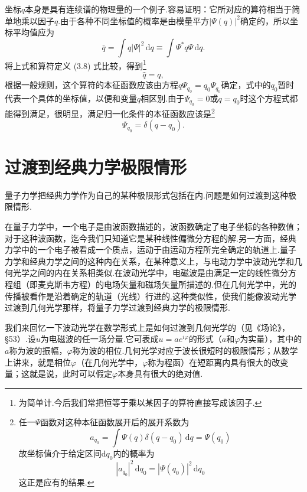坐标$q$本身是具有连续谱的物理量的一个例子.容易证明：它所对应的算符相当于简单地乘以因子$q$.由于各种不同坐标值的概率是由模量平方$|\varPsi(q)|^2$确定的，所以坐标平均值应为
\begin{equation*}
  \bar{q}=\int q|\varPsi|^2\,\mathrm{d}q
  \equiv\int\varPsi^{*}q\varPsi\,\mathrm{d}q.
\end{equation*}
将上式和算符定义 (3.8) 式比较，得到\footnote{为简单计.今后我们常把恒等于乘以某因子的算符直接写成该因子.}
\begin{equation}
  \hat{q}=q,
\end{equation}
根据一般规则，这个算符的本征函数应该由方程$q\varPsi_{q_0}=q_0\varPsi_{q_0}$确定，式中的$q_0$暂时代表一个具体的坐标值，以便和变量$q$相区别.由于$\varPsi_{q_0}=0$或$q=q_0$时这个方程式都能得到满足，很明显，满足归一化条件的本征函数应该是\footnote{任一$\varPsi$函数对这种本征函数展开后的展开系数为
\begin{equation*}
  a_{q_0}=\int\varPsi(q)\delta(q-q_0)\,\mathrm{d}q=\varPsi(q_0)
\end{equation*}
故坐标值介于给定区间$\mathrm{d}q_0$内的概率为
\begin{equation*}
  |a_{q_0}|^{2}\,\mathrm{d}q_0=|\varPsi(q_0)|^{2}\,\mathrm{d}q_0
\end{equation*}
这正是应有的结果.}
\begin{equation}
  \varPsi_{q_0}=\delta(q-q_0).
\end{equation}

\section{过渡到经典力学极限情形}

量子力学把经典力学作为自己的某种极限形式包括在内.问题是如何过渡到这种极限情形.

在量子力学中，一个电子是由波函数描述的，波函数确定了电子坐标的各种数值；对于这种波函数，迄今我们只知道它是某种线性偏微分方程的解.另一方面，经典力学中的一个电子被看成一个质点，运动于由运动方程所完全确定的轨道上.量子力学和经典力学之间的这种内在关系，在某种意义上，与电动力学中波动光学和几何光学之间的内在关系相类似.在波动光学中，电磁波是由满足一定的线性微分方程组（即麦克斯韦方程）的电场矢量和磁场矢量所描述的.但在几何光学中，光的传播被看作是沿着确定的轨道（光线）行进的.这种类似性，使我们能像波动光学过渡到几何光学那样，将量子力学过渡到经典力学的极限情形.

我们来回忆一下波动光学在数学形式上是如何过渡到几何光学的（见《场论》，§53）.设$u$为电磁波的任一场分量.它可表成$u=ae^{i\varphi}$的形式（$a$和$\varphi$为实量），其中的$a$称为波的振幅，$\varphi$称为波的相位.几何光学对应于波长很短时的极限情形；从数学上讲来，就是相位$\varphi$（在几何光学中，$\varphi$称为程函）在短距离内具有很大的改变量；这就是说，此时可以假定$\varphi$本身具有很大的绝对值.

